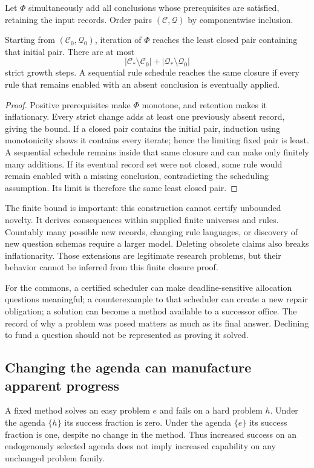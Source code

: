 Let $\Phi$ simultaneously add all conclusions whose prerequisites are satisfied, retaining the input records. Order pairs $(\mathcal C,\mathcal Q)$ by componentwise inclusion.
\begin{MSproposition}\label{MS:prop:agendaclosure}
Starting from $(\mathcal C_0,\mathcal Q_0)$, iteration of $\Phi$ reaches the least closed pair containing that initial pair. There are at most
\[
|\mathcal C_*\setminus\mathcal C_0|+|\mathcal Q_*\setminus\mathcal Q_0|
\]
strict growth steps. A sequential rule schedule reaches the same closure if every rule that remains enabled with an absent conclusion is eventually applied.
\end{MSproposition}
\begin{proof}
Positive prerequisites make $\Phi$ monotone, and retention makes it inflationary. Every strict change adds at least one previously absent record, giving the bound. If a closed pair contains the initial pair, induction using monotonicity shows it contains every iterate; hence the limiting fixed pair is least. A sequential schedule remains inside that same closure and can make only finitely many additions. If its eventual record set were not closed, some rule would remain enabled with a missing conclusion, contradicting the scheduling assumption. Its limit is therefore the same least closed pair.
\end{proof}

The finite bound is important: this construction cannot certify unbounded novelty. It derives consequences within supplied finite universes and rules. Countably many possible new records, changing rule languages, or discovery of new question schemas require a larger model. Deleting obsolete claims also breaks inflationarity. Those extensions are legitimate research problems, but their behavior cannot be inferred from this finite closure proof.

For the commons, a certified scheduler can make deadline-sensitive allocation questions meaningful; a counterexample to that scheduler can create a new repair obligation; a solution can become a method available to a successor office. The record of why a problem was posed matters as much as its final answer. Declining to fund a question should not be represented as proving it solved.

\subsection{Changing the agenda can manufacture apparent progress}
\begin{MScounterexample}\label{MS:ex:agendadrift}
A fixed method solves an easy problem $e$ and fails on a hard problem $h$. Under the agenda $\{h\}$ its success fraction is zero. Under the agenda $\{e\}$ its success fraction is one, despite no change in the method. Thus increased success on an endogenously selected agenda does not imply increased capability on any unchanged problem family.
\end{MScounterexample}

